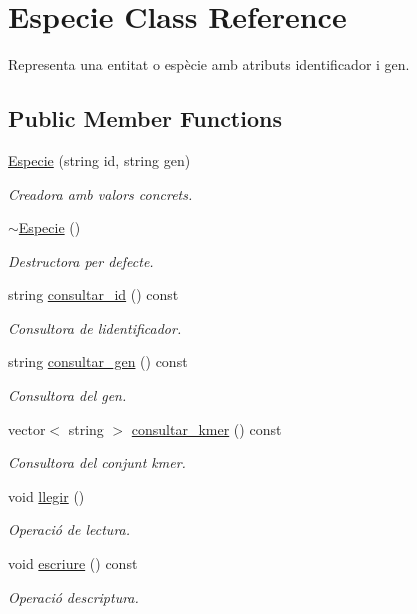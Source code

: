 \hypertarget{class_especie}{}\section{Especie Class Reference}
\label{class_especie}


Representa una entitat o espècie amb atributs identificador i gen.  


\subsection*{Public Member Functions}
\begin{DoxyCompactItemize}
\item 
\hyperlink{class_especie_af820c686aa53f39507b5e1662868789f}{Especie} (string id, string gen)
\begin{DoxyCompactList}\small\item\em Creadora amb valors concrets. \end{DoxyCompactList}\item 
\hyperlink{class_especie_abd21378dde6e8348d823c6f87a1c0658}{$\sim$\+Especie} ()
\begin{DoxyCompactList}\small\item\em Destructora per defecte. \end{DoxyCompactList}\item 
string \hyperlink{class_especie_a1652f05cd2ff7dc71123bf538ecc4476}{consultar\+\_\+id} () const
\begin{DoxyCompactList}\small\item\em Consultora de l\textquotesingle{}identificador. \end{DoxyCompactList}\item 
string \hyperlink{class_especie_a850af2b59a21e2d801c59d76ba5c1a98}{consultar\+\_\+gen} () const
\begin{DoxyCompactList}\small\item\em Consultora del gen. \end{DoxyCompactList}\item 
vector$<$ string $>$ \hyperlink{class_especie_a942d65fe47049ce8fb9330e29455f5f5}{consultar\+\_\+kmer} () const
\begin{DoxyCompactList}\small\item\em Consultora del conjunt kmer. \end{DoxyCompactList}\item 
void \hyperlink{class_especie_a7384add391d2684c4fb6bdf8a535fba3}{llegir} ()
\begin{DoxyCompactList}\small\item\em Operació de lectura. \end{DoxyCompactList}\item 
void \hyperlink{class_especie_ae24802ae0746b2560a48eea40f64760e}{escriure} () const
\begin{DoxyCompactList}\small\item\em Operació d\textquotesingle{}escriptura. \end{DoxyCompactList}\end{DoxyCompactItemize}


